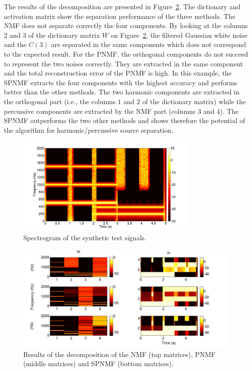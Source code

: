 The results of the decomposition are presented in Figure~\ref{resultONMF2}. The dictionary and activation matrix show the separation performance of the three methods. The NMF does not separate correctly the four components. By looking at the columns $2$ and $3$ of the dictionary matrix $W$ on Figure~\ref{resultONMF2}, the filtered Gaussian white noise and the $C(3)$ are separated in the same components which does not correspond to the expected result.
For the PNMF, the orthogonal components do not succeed to represent the two noises correctly. They are extracted in the same component and the total reconstruction error of the PNMF is high.
In this example, the SPNMF extracts the four components with the highest accuracy and performs better than the other methods. The two harmonic components are extracted in the orthogonal part (i.e., the columns $1$ and $2$ of the dictionary matrix) while the percussive components are extracted by the NMF part (columns $3$ and $4$). The SPNMF outperforms the two other methods and shows therefore the potential of the algorithm for harmonic/percussive source separation.
%

\begin{figure}[htb]

  \centering 
  \includegraphics[width=9cm]{fig/synthetictestspectrogram}
  \caption{\label{SpectroSynth} Spectrogram of the synthetic test signals.}
  
\end{figure}

\begin{figure}
   
	\centering    
  \includegraphics[width=15cm]{fig/WHcomp}

\caption{\label{resultONMF2} Results of the decomposition of the NMF (top matrices), PNMF (middle matrices) and SPNMF (bottom matrices).}


\end{figure}


